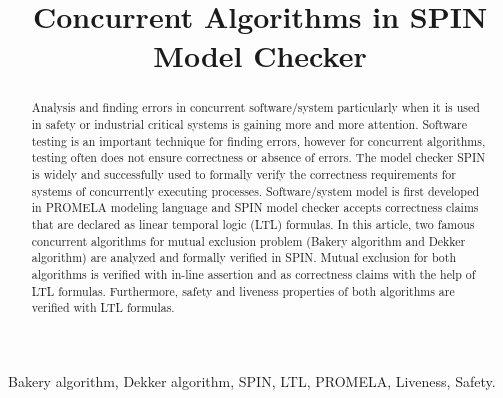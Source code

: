 \documentclass[conference]{IEEEtran}
\begin{document}
\title{Concurrent Algorithms in SPIN Model Checker}

\author{ 
}

\maketitle

\begin{abstract}
Analysis and finding errors in concurrent software/system particularly when it is used in safety or industrial critical systems is gaining more 
and more attention. Software testing is an important technique for finding errors, however for concurrent algorithms, testing often does not ensure 
correctness or absence of errors. The model checker SPIN is widely and successfully used to formally verify the correctness requirements for systems
of concurrently executing processes. Software/system model is first developed in PROMELA modeling language and SPIN model checker accepts correctness
claims that are declared as linear temporal logic (LTL) formulas. In this article, two famous concurrent algorithms for mutual exclusion problem 
(Bakery algorithm and Dekker algorithm) are analyzed and formally verified in SPIN. Mutual exclusion for both algorithms is verified with in-line
assertion and as correctness claims with the help of LTL formulas. Furthermore, safety and liveness properties of both algorithms are verified 
with LTL formulas.
\end{abstract}

\begin{IEEEkeywords}
Bakery algorithm, Dekker algorithm, SPIN, LTL, PROMELA, Liveness, Safety.
\end{IEEEkeywords}
\IEEEpeerreviewmaketitle
\end{document}
